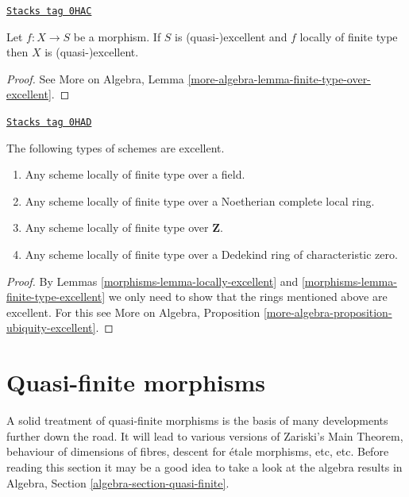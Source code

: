 \begin{lemma}
\label{morphisms-lemma-finite-type-excellent}
\href{https://stacks.math.columbia.edu/tag/0HAC}{\texttt{Stacks tag 0HAC}}

Let $f : X \to S$ be a morphism.
If $S$ is (quasi-)excellent and $f$ locally of finite type then
$X$ is (quasi-)excellent.
\end{lemma}

\begin{proof}
See More on Algebra, Lemma \ref{more-algebra-lemma-finite-type-over-excellent}.
\end{proof}

\begin{lemma}
\label{morphisms-lemma-ubiquity-excellent}
\href{https://stacks.math.columbia.edu/tag/0HAD}{\texttt{Stacks tag 0HAD}}

The following types of schemes are excellent.
\begin{enumerate}
\item Any scheme locally of finite type over a field.
\item Any scheme locally of finite type over a Noetherian complete local ring.
\item Any scheme locally of finite type over $\mathbf{Z}$.
\item Any scheme locally of finite type over a Dedekind ring of
characteristic zero.
\end{enumerate}
\end{lemma}

\begin{proof}

By Lemmas \ref{morphisms-lemma-locally-excellent} and \ref{morphisms-lemma-finite-type-excellent}
we only need to show that the rings mentioned above are excellent.
For this see
More on Algebra, Proposition \ref{more-algebra-proposition-ubiquity-excellent}.
\end{proof}

\section{Quasi-finite morphisms}
\label{morphisms-section-quasi-finite}
A solid treatment of quasi-finite morphisms is the basis of many developments
further down the road. It will lead to various versions of Zariski's Main
Theorem, behaviour of dimensions of fibres, descent for \'etale morphisms, etc,
etc. Before reading this section it may be a good idea to take a look at
the algebra results in Algebra, Section \ref{algebra-section-quasi-finite}.

